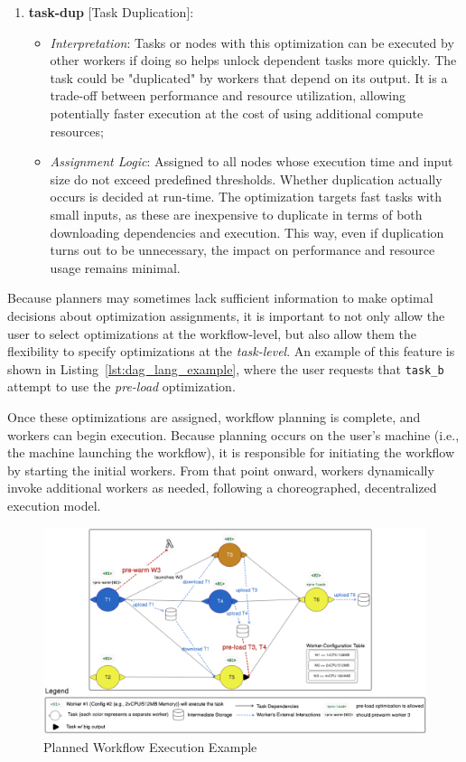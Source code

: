 \documentclass[conference]{IEEEtran}
\begin{document}
\begin{enumerate}
\item\textbf{task-dup} [Task Duplication]:
\begin{itemize}
  \item \textit{Interpretation}: Tasks or nodes with this optimization can be executed by other workers if doing so helps unlock dependent tasks more quickly. The task could be "duplicated" by workers that depend on its output. It is a trade-off between performance and resource utilization, allowing potentially faster execution at the cost of using additional compute resources;
  \item \textit{Assignment Logic}: Assigned to all nodes whose execution time and input size do not exceed predefined thresholds. Whether duplication actually occurs is decided at run-time. The optimization targets fast tasks with small inputs, as these are inexpensive to duplicate in terms of both downloading dependencies and execution. This way, even if duplication turns out to be unnecessary, the impact on performance and resource usage remains minimal.
\end{itemize}
\end{enumerate}
Because planners may sometimes lack sufficient information to make optimal decisions about optimization assignments, it is important to not only allow the user to select optimizations at the workflow-level, but also allow them the flexibility to specify optimizations at the \textit{task-level}. An example of this feature is shown in Listing~\ref{lst:dag_lang_example}, where the user requests that \texttt{task\_b} attempt to use the \textit{pre-load} optimization.

Once these optimizations are assigned, workflow planning is complete, and workers can begin execution. Because planning occurs on the user's machine (i.e., the machine launching the workflow), it is responsible for initiating the workflow by starting the initial workers. From that point onward, workers dynamically invoke additional workers as needed, following a choreographed, decentralized execution model.

\begin{figure}[h]
    \centering
    \includegraphics[width=\textwidth]{figures/solution_workflowinstanceexample.png}
    \caption{Planned Workflow Execution Example}
    \label{fig:planned_workflow_execution_example}
\end{figure}
\end{document}
